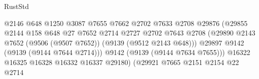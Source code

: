 \begin{lexlean}{RustStd}
\begin{coremodule}
                                                    @2146
                                                    @648
                                                    @1250
                                                    @3087
                                                    @7655
                                                    @7662
                                                    @2702
                                                    @7633
                                                    @2708
                                                    @29876
                                                    (@29855
                                                      @2144
                                                      @158
                                                      @648
                                                      @27
                                                      @7652
                                                      @2714
                                                      @2727
                                                      @2702
                                                      @7643
                                                      @2708
                                                      (@29890
                                                        @2143
                                                        @7652
                                                        (@9506 (@9507 @7652))
                                                        (@9139 (@9512 @2143 @648)))
                                                      @29897
                                                      @9142
                                                      (@9139 (@9144 @7644 @2714)))
                                                    @9142
                                                    (@9139 (@9144 @7634 @7655)))
                                                  @16322
                                                  @16325
                                                  @16328
                                                  @16332
                                                  @16337
                                                  @29180)
                                                (@29921
                                                  @7665
                                                  @2151
                                                  @2154
                                                  @22
                                                  @2714

\end{coremodule}
\end{lexlean}

